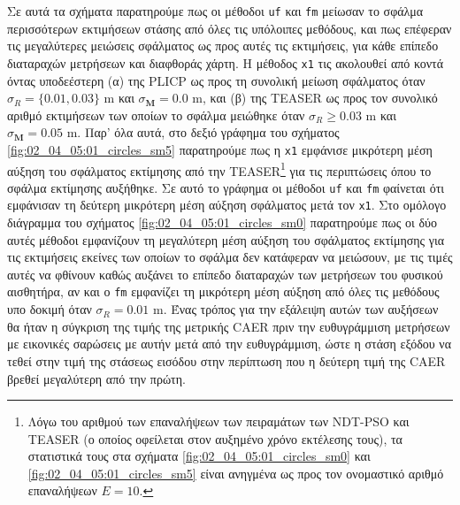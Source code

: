 Σε αυτά τα σχήματα παρατηρούμε πως οι μέθοδοι \texttt{uf} και \texttt{fm}
μείωσαν το σφάλμα περισσότερων εκτιμήσεων στάσης από όλες τις υπόλοιπες
μεθόδους, και πως επέφεραν τις μεγαλύτερες μειώσεις σφάλματος ως προς αυτές τις
εκτιμήσεις, για κάθε επίπεδο διαταραχών μετρήσεων και διαφθοράς χάρτη. Η
μέθοδος \texttt{x1} τις ακολουθεί από κοντά όντας υποδεέστερη (α) της PLICP ως
προς τη συνολική μείωση σφάλματος όταν $\sigma_R = \{0.01, 0.03\}$ m και
$\sigma_{\bm{M}} = 0.0$ m, και (β) της TEASER ως προς τον συνολικό αριθμό
εκτιμήσεων των οποίων το σφάλμα μειώθηκε όταν $\sigma_R \geq 0.03$ m και
$\sigma_{\bm{M}} = 0.05$ m. Παρ' όλα αυτά, στο δεξιό γράφημα του σχήματος
\ref{fig:02_04_05:01_circles_sm5} παρατηρούμε πως η \texttt{x1} εμφάνισε
μικρότερη μέση αύξηση του σφάλματος εκτίμησης από την TEASER\footnote{Λόγω του
αριθμού των επαναλήψεων των πειραμάτων των NDT-PSO και TEASER (ο οποίος
οφείλεται στον αυξημένο χρόνο εκτέλεσης τους), τα στατιστικά τους στα σχήματα
\ref{fig:02_04_05:01_circles_sm0} και \ref{fig:02_04_05:01_circles_sm5} είναι
ανηγμένα ως προς τον ονομαστικό αριθμό επαναλήψεων $E=10$.} για τις περιπτώσεις
όπου το σφάλμα εκτίμησης αυξήθηκε. Σε αυτό το γράφημα οι μέθοδοι \texttt{uf}
και \texttt{fm} φαίνεται ότι εμφάνισαν τη δεύτερη μικρότερη μέση αύξηση
σφάλματος μετά τον \texttt{x1}. Στο ομόλογο διάγραμμα του σχήματος
\ref{fig:02_04_05:01_circles_sm0} παρατηρούμε πως οι δύο αυτές μέθοδοι
εμφανίζουν τη μεγαλύτερη μέση αύξηση του σφάλματος εκτίμησης για τις εκτιμήσεις
εκείνες των οποίων το σφάλμα δεν κατάφεραν να μειώσουν, με τις τιμές αυτές να
φθίνουν καθώς αυξάνει το επίπεδο διαταραχών των μετρήσεων του φυσικού
αισθητήρα, αν και ο \texttt{fm} εμφανίζει τη μικρότερη μέση αύξηση από όλες τις
μεθόδους υπο δοκιμή όταν $\sigma_R = 0.01$ m. Ένας τρόπος για την εξάλειψη
αυτών των αυξήσεων θα ήταν η σύγκριση της τιμής της μετρικής CAER πριν την
ευθυγράμμιση μετρήσεων με εικονικές σαρώσεις με αυτήν μετά από την
ευθυγράμμιση, ώστε η στάση εξόδου να τεθεί στην τιμή της στάσεως εισόδου στην
περίπτωση που η δεύτερη τιμή της CAER βρεθεί μεγαλύτερη από την πρώτη.


